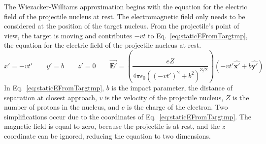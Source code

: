     The Wiezacker-Williams approximation begins with the equation for the 
      electric field of the projectile nucleus at rest. 
    The electromagnetic field only needs to be considered at the position of 
      the target nucleus. 
    From the projectile's point of view, the target is moving and contributes
     $-vt$ to Eq.~\ref{eq:staticEFromTargtmp}, the equation for the electric 
     field of the projectile nucleus at rest.
    \begin{equation} \label{eq:staticEFromTargtmp}
        x'=-vt'\qquad
        y'=b\qquad
        z'=0\qquad
	\vec{\mathbf{E'}}=\left(\frac{eZ}
         {4 \pi \epsilon_{0}\left(\left(-vt'\right)^{2}+b^{2}\right)^{3/2}}\right)
	 \left(-vt'{\mathbf{\hat{x'}}+b\mathbf{\hat{y'}}}\right)
    \end{equation}        
    In Eq.~\ref{eq:staticEFromTargtmp}, $b$ is the impact parameter, 
      the distance of separation at closest approach, $v$ is the velocity of the 
      projectile nucleus, $Z$ is the number of protons in the nucleus, and $e$ 
      is the charge of the electron.
    Two simplifications occur due to the coordinates of 
      Eq.~\ref{eq:staticEFromTargtmp}.
    The magnetic field is equal to zero, because the projectile is at rest, and
      the $z$ coordinate can be ignored, reducing the equation to two dimensions. 

